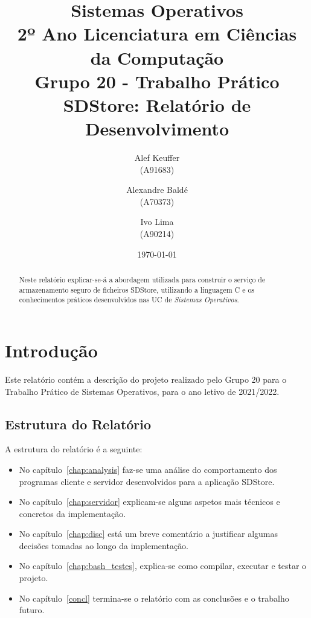 \documentclass[11pt,a4paper]{report}%
\title{Sistemas Operativos\\
      2º Ano Licenciatura em Ciências da Computação \\
      \textbf{Grupo 20 - Trabalho Prático}\\ SDStore: Relatório de Desenvolvimento
      } %
\author{Alef Keuffer\\ (A91683) \and Alexandre Baldé\\ (A70373)
         \and Ivo Lima\\ (A90214)
       } %
\date{\today} %
\def\so{\emph{Sistemas Operativos}\xspace}
\begin{document}
\maketitle %

\begin{abstract}  %
Neste relatório explicar-se-á a abordagem utilizada para construir o serviço de
armazenamento seguro de ficheiros SDStore, utilizando a linguagem C e os conhecimentos
práticos desenvolvidos nas UC de \so.
\end{abstract}

\tableofcontents %
\listoffigures %

\chapter{Introdução} \label{chap:intro} %

Este relatório contém a descrição do projeto realizado pelo Grupo 20 para
o Trabalho Prático de Sistemas Operativos, para o ano letivo de 2021/2022.

\section*{Estrutura do Relatório}

A estrutura do relatório é a seguinte:
\begin{itemize}
\item No capítulo~\ref{chap:analysis} faz-se uma análise do comportamento dos
  programas cliente e servidor desenvolvidos para a aplicação SDStore.

\item No capítulo~\ref{chap:servidor} explicam-se alguns aspetos mais técnicos e concretos da implementação.

\item No capítulo~\ref{chap:disc} está um breve comentário a justificar algumas decisões tomadas
ao longo da implementação.

\item No capítulo~\ref{chap:bash_testes}, explica-se como compilar, executar e testar o projeto.

\item No capítulo~\ref{concl} termina-se o relatório com as conclusões e o trabalho futuro.
\end{itemize}
\end{document}
